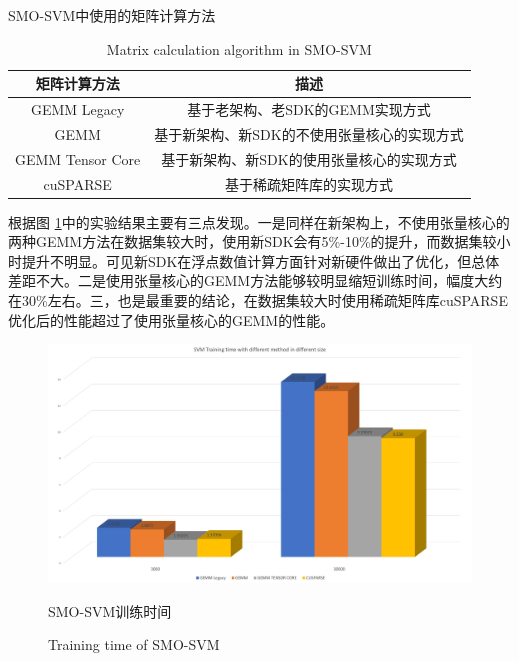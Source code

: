 \begin{table}
	\centering
	\renewcommand{\thetable}{\arabic{section}-\arabic{table} }
	\renewcommand{\tablename}{表}
	\caption{SMO-SVM中使用的矩阵计算方法}
	\addtocounter{table}{-1}
	\renewcommand{\thetable}{\arabic{section}-\arabic{table} }
	\renewcommand{\tablename}{Table}
	\caption{Matrix calculation algorithm in SMO-SVM}
	\begin{tabular}{cc}
		\toprule
		矩阵计算方法 & 描述	\\
		\midrule
		GEMM Legacy & 基于老架构、老SDK的GEMM实现方式\\
		GEMM & 基于新架构、新SDK的不使用张量核心的实现方式\\
		GEMM Tensor Core& 基于新架构、新SDK的使用张量核心的实现方式\\
		cuSPARSE & 基于稀疏矩阵库的实现方式\\
		\bottomrule
	\end{tabular} \label{table-SMOSVM} 
\end{table}
\par 根据图 \ref{Fig-SMOSVMRES}中的实验结果主要有三点发现。一是同样在新架构上，不使用张量核心的两种GEMM方法在数据集较大时，使用新SDK会有5\%-10\%的提升，而数据集较小时提升不明显。可见新SDK在浮点数值计算方面针对新硬件做出了优化，但总体差距不大。二是使用张量核心的GEMM方法能够较明显缩短训练时间，幅度大约在30\%左右。三，也是最重要的结论，在数据集较大时使用稀疏矩阵库cuSPARSE优化后的性能超过了使用张量核心的GEMM的性能。
\begin{figure}
	\centering
	\includegraphics[width=15cm]{figures/SMOSVMRES.jpg}
	\renewcommand{\thefigure}{\arabic{section}-\arabic{figure} }
	\renewcommand{\figurename}{图}
	\caption{SMO-SVM训练时间}
	\addtocounter{figure}{-1}
	\renewcommand{\thefigure}{\arabic{section}-\arabic{figure} }
	\renewcommand{\figurename}{Figure}
	\caption{Training time of SMO-SVM}
	\label{Fig-SMOSVMRES}
\end{figure}
